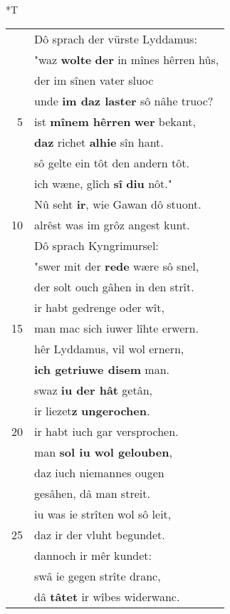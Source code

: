 \documentclass[8pt,a4paper,notitlepage]{article}
\begin{document}
\begin{table}[ht]
\begin{minipage}[t]{0.5\linewidth}
\end{minipage}
\hspace{0.5cm}
\begin{minipage}[t]{0.5\linewidth}
\small
\begin{center}*T
\end{center}
\begin{tabular}{rl}
 & Dô sprach der vürste Lyddamus:\\ 
 & "waz \textbf{wolte} \textbf{der} in mînes hêrren hûs,\\ 
 & der im sînen vater sluoc\\ 
 & unde \textbf{im daz laster} sô nâhe truoc?\\ 
5 & ist \textbf{mînem hêrren} \textbf{wer} bekant,\\ 
 & \textbf{daz} richet \textbf{alhie} sîn hant.\\ 
 & sô gelte ein tôt den andern tôt.\\ 
 & ich wæne, glîch \textbf{sî} \textbf{diu} nôt."\\ 
 & Nû seht \textbf{ir}, wie Gawan dô stuont.\\ 
10 & alrêst was im grôz angest kunt.\\ 
 & Dô sprach Kyngrimursel:\\ 
 & "swer mit der \textbf{rede} wære sô snel,\\ 
 & der solt ouch gâhen in den strît.\\ 
 & ir habt gedrenge oder wît,\\ 
15 & man mac sich iuwer lîhte erwern.\\ 
 & hêr Lyddamus, vil wol ernern,\\ 
 & \textbf{ich getriuwe disem} man.\\ 
 & swaz \textbf{iu der hât} getân,\\ 
 & ir liezet\textbf{z} \textbf{ungerochen}.\\ 
20 & ir habt iuch gar versprochen.\\ 
 & man \textbf{sol iu wol gelouben},\\ 
 & daz iuch niemannes ougen\\ 
 & gesâhen, dâ man streit.\\ 
 & iu was ie strîten wol sô leit,\\ 
25 & daz ir der vluht begundet.\\ 
 & dannoch ir mêr kundet:\\ 
 & swâ ie gegen strîte dranc,\\ 
 & dâ \textbf{tâtet} ir wîbes widerwanc.\\ 

\end{tabular}
\end{minipage}
\end{table}
\end{document}
